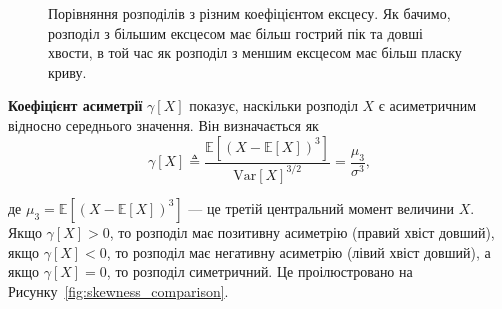 \documentclass{exam_template}
\begin{document}
\begin{figure}[H]
\centering
{}
\caption{Порівняння розподілів з різним коефіцієнтом ексцесу. Як бачимо, розподіл
з більшим ексцесом має більш гострий пік та довші хвости, в той час як розподіл
з меншим ексцесом має більш пласку криву.}
\label{fig:kurtosis_comparison}
\end{figure}

\textbf{Коефіцієнт асиметрії} $\gamma[X]$ показує, наскільки розподіл $X$ є
асиметричним відносно середнього значення. Він визначається як
\begin{equation*}
    \gamma[X] \triangleq \frac{\mathbb{E}[(X - \mathbb{E}[X])^3]}{\text{Var}[X]^{3/2}} = \frac{\mu_3}{\sigma^3},
\end{equation*}

де $\mu_3 = \mathbb{E}[(X - \mathbb{E}[X])^3]$ — це третій центральний момент
величини $X$. Якщо $\gamma[X] > 0$, то розподіл має позитивну асиметрію (правий
хвіст довший), якщо $\gamma[X] < 0$, то розподіл має негативну асиметрію
(лівий хвіст довший), а якщо $\gamma[X] = 0$, то розподіл симетричний. Це
проілюстровано на Рисунку~\ref{fig:skewness_comparison}.
\end{document}

